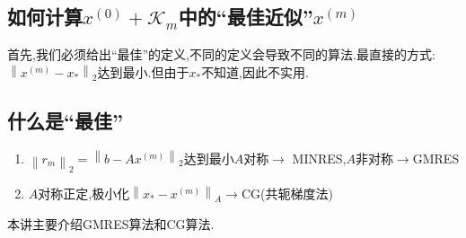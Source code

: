 \documentclass[12pt,a4paper]{article}
\begin{document}
\subsection*{如何计算$x^{(0)}+\mathcal{K}_{m}$中的“最佳近似”$x^{(m)}$}
首先,我们必须给出“最佳”的定义,不同的定义会导致不同的算法.最直接的方式:$\left\|x^{(m)}-x_{*}\right\|_{2}$达到最小.但由于$x_{*}$不知道,因此不实用.\\
\subsection*{\color{blue}什么是“最佳”}
\begin{enumerate}[(1)]
\item $\left\|r_{m}\right\|_{2}=\left\|b-A x^{(m)}\right\|_{2}$达到最小$A$对称$\to$ {\color{blue}MINRES},$A$非对称$\to${\color{blue}GMRES}
\item $A$对称正定,极小化$\left\|x_{*}-x^{(m)}\right\|_{A} \rightarrow \mathrm{CG}$(共轭梯度法)
\end{enumerate}
本讲主要介绍{\color{blue}GMRES}算法和{\color{blue}CG}算法.\\
\end{document}
